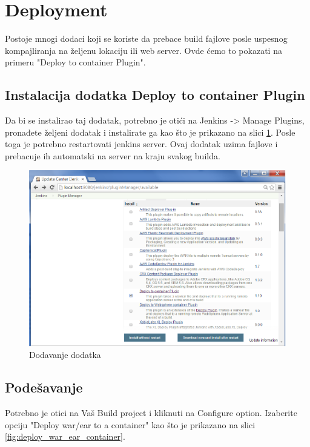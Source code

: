 
\section{Deployment}

Postoje mnogi dodaci koji se koriste da prebace build fajlove posle uspesnog kompajliranja na željenu lokaciju ili web server. Ovde ćemo to pokazati na primeru "Deploy to container Plugin". 

\subsection{Instalacija dodatka Deploy to container Plugin}

Da bi se instalirao taj dodatak, potrebno je otići na Jenkins -> Manage Plugins, pronađete željeni dodatak i instalirate ga kao što je prikazano na slici \ref{fig:deploy_to_container_plugin}. Posle toga je potrebno restartovati jenkins server. Ovaj dodatak uzima fajlove i prebacuje ih automatski na server na kraju svakog builda.
\begin{figure}
\begin{center}
\includegraphics[scale=0.45]{slike/deploy_to_container_plugin.png}
\end{center}
\caption{Dodavanje dodatka}
\label{fig:deploy_to_container_plugin}
\end{figure}


\subsection{Podešavanje}

Potrebno je otici na Vaš Build project i kliknuti na Configure option. Izaberite opciju "Deploy war/ear to a container" kao što je prikazano na slici \ref{fig:deploy_war_ear_container}.

